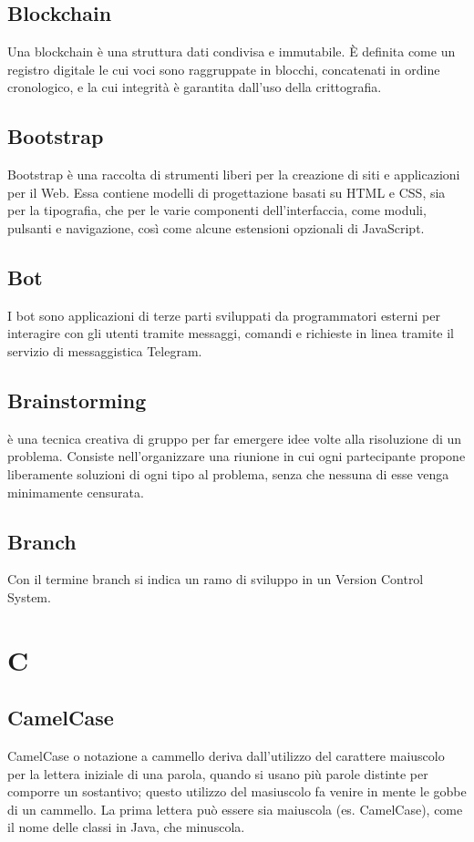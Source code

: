 \subsection{Blockchain}  Una blockchain è una struttura dati condivisa e immutabile. È definita come un registro digitale le cui voci sono raggruppate in blocchi, concatenati in ordine cronologico, e la cui integrità è garantita dall'uso della crittografia.
\subsection{Bootstrap}  Bootstrap è una raccolta di strumenti liberi per la creazione di siti e applicazioni per il Web. Essa contiene modelli di progettazione basati su HTML e CSS, sia per la tipografia, che per le varie componenti dell'interfaccia, come moduli, pulsanti e navigazione, così come alcune estensioni opzionali di JavaScript.
\subsection{Bot}  I bot sono applicazioni di terze parti sviluppati da programmatori esterni per interagire con gli utenti tramite messaggi, comandi e richieste in linea tramite il servizio di messaggistica Telegram.
\subsection{Brainstorming }  è una tecnica creativa di gruppo per far emergere idee volte alla risoluzione di un problema. Consiste nell'organizzare una riunione in cui ogni partecipante propone liberamente soluzioni di ogni tipo al problema, senza che nessuna di esse venga minimamente censurata.
\subsection{Branch}  Con il termine branch si indica un ramo di sviluppo in un Version Control System.

\newpage \section{C}
\subsection{CamelCase}  CamelCase o notazione a cammello deriva dall'utilizzo del carattere maiuscolo per la lettera iniziale di una parola, quando si usano più parole distinte per comporre un sostantivo; questo utilizzo del masiuscolo fa venire in mente le gobbe di un cammello. La prima lettera può essere sia maiuscola (es. CamelCase), come il nome delle classi in Java, che minuscola.
